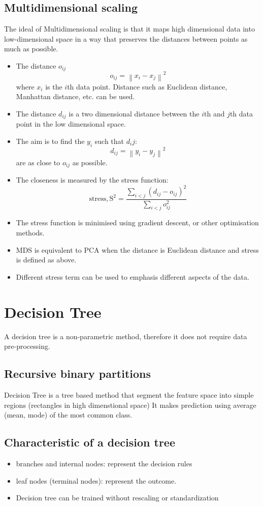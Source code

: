 \documentclass[12pt,a4paper]{article}
\begin{document}
\subsection{Multidimensional scaling}
The ideal of Multidimensional scaling is that it maps high dimensional data into low-dimensional space in a way that preserves the distances between points as much as possible.
\begin{itemize}
    \item The distance $o_{ij}$
    $$
    o_{i j}=\left\|x_{i}-x_{j}\right\|^{2}
    $$
    where $x_i$ is the $i$th data point. Distance such as Euclidean distance, Manhattan distance, etc. can be used.
    \item The distance $d_{ij}$ is a two dimensional distance between the $i$th and $j$th data point in the low dimensional space.
    \item The aim is to find the $y_i$ such that $d_ij$:
    $$
    d_{i j}=\left\|y_{i}-y_{j}\right\|^{2}
    $$
    are as close to $o_{ij}$ as possible.
    \item The closeness is measured by the stress function:
    $$
    \operatorname{stress, S^2}={\frac{\sum_{i<j}\left(d_{i j}-o_{i j}\right)^{2}}{\sum_{i<j} o_{i j}^{2}}}
    $$
    \item The stress function is minimised using gradient descent, or other optimisation methods.
    \item MDS is equivalent to PCA when the distance is Euclidean distance and stress is defined as above.
    \item Different stress term can be used to emphasis different aspects of the data.
\end{itemize}
   
\section{Decision Tree}
    A decision tree is a non-parametric method, therefore it does not require data pre-processing.
    \subsection{Recursive binary partitions}
        Decision Tree is a tree based method that segment the feature space into simple regions (rectangles in high dimenstional space)
        It makes prediction using average (mean, mode) of the most common class.
    \subsection{Characteristic of a decision tree}
        \begin{itemize}
            \item branches and internal nodes: represent the decision rules
            \item leaf nodes (terminal nodes): represent the outcome.
            \item Decision tree can be trained without rescaling or standardization
        \end{itemize}
\end{document}
